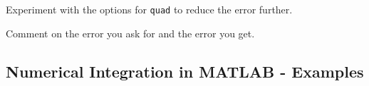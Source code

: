 \vsc

\problem Experiment with the options for \texttt{quad} to reduce the
  error further.

\vsc

\problem Comment on the error you ask for and the error you get.

\vfill


\newpage

\subsection*{Numerical Integration in MATLAB - Examples}



\newpage





